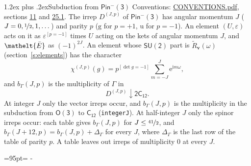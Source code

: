\documentclass[10pt,a4paper]{article}
\makeatletter
\renewcommand\section{\@startsection{section}{1}{\z@}{-3ex plus -1ex minus -.2ex}%
  {1.2ex plus .2ex}{\normalfont\large\sffamily\bfseries\color{parttitle}}}
\newcommand{\needspace}[1]{\par\penalty-100\begingroup\dimen0=#1\relax\dimen2=\pagegoal
  \advance\dimen2-\pagetotal\ifdim\dimen0>\dimen2\relax\ifdim\dimen2>0pt\vfil\break\fi\fi
  \endgroup}
\numberwithin{equation}{section}
\newcommand{\eltfont}[1]{{\let\sigma\eltsigma\mathelt{#1}}}
\newcommand{\grp}[1]{\mathsf{#1}}
\newcommand{\elt}[1]{\eltfont{#1}}
\newcommand{\ptag}[1]{\mathrm{#1}}
\newcommand{\iverson}[1]{[#1]}
\newcommand{\restr}[2]{#1\!\downarrow#2}
\newcommand{\vv}{\mathbf{v}}
\newcommand{\iunit}{\mathrm{i}}
\newcommand{\expe}{\mathrm{e}}
\newcommand{\irrJp}[2]{D^{(#1,#2)}}
\newcommand{\barred}[1]{\bar{#1}}
\newcommand{\lift}[1]{\tilde{#1}}
\makeatother
\begin{document}
\section{Subduction from \texorpdfstring{$\grp{Pin^{-}(3)}$}{Pin(3)}}\label{s:subduction_parent}
Conventions: \href{../../CONVENTIONS.pdf}{CONVENTIONS.pdf}, sections \href{../../../rotation/CONVENTIONS.pdf\#conv.11}{11} and \href{../../CONVENTIONS.pdf\#conv.25.1}{25.1}.
\leavevmode\label{n:index.J}\label{n:index.parity}\label{n:irrep.o3}The irrep $\irrJp{J}{p}$ of \href{Pinminus3.pdf}{$\grp{Pin^{-}(3)}$} has angular momentum $J$ ($J = 0, \nicefrac{1}{2}, 1, \dots$) and parity $p$ ($\ptag{g}$ for $p = +1$, $\ptag{u}$ for $p = -1$). An element $(U, \varepsilon)$ acts on it as $\varepsilon^{[p = -1]}$ times $U$ acting on the kets of angular momentum $J$, and $\elt{\barred{E}}$ as $(-1)^{2J}$. \label{n:function.character.parent}\label{n:function.multiplicity}An element whose $\grp{SU(2)}$ part is $\lift{R}_{\vv}(\omega)$ (section~\ref{s:elements}) has the character
\begin{equation}\label{e:chi}\chi^{(J,p)}(g) = p^{\iverson{\det g = -1}}\sum_{m=-J}^{J} \expe^{\iunit m\omega},\end{equation}
and $b_\Gamma(J, p)$ is the multiplicity of $\Gamma$ in
\begin{equation}\label{e:parent}\restr{\irrJp{J}{p}}{\grp{2C_{12}}}.\end{equation}
At integer $J$ only the vector irreps occur, and $b_\Gamma(J, p)$ is the multiplicity in the subduction from $\grp{O(3)}$ to \href{../../../rotation/data/pdf/C12.pdf}{$\grp{C_{12}}$} (\texttt{integerJ}). \label{n:index.increment}At half-integer $J$ only the spinor irreps occur: each table gives $b_\Gamma(J, p)$ for $J \le \nicefrac{41}{2}$, and $b_\Gamma(J + 12, p) = b_\Gamma(J, p) + \Delta_\Gamma$ for every $J$, where $\Delta_\Gamma$ is the last row of the table of parity $p$. A table leaves out irreps of multiplicity 0 at every $J$.
\needspace{95pt}
\end{document}
